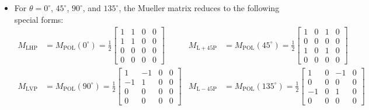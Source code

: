 \documentclass[10pt]{article}
\begin{document}
\begin{itemize}
		\item For $\theta = 0^\circ$, $45^\circ$, $90^\circ$, and $135^\circ$, the Mueller matrix reduces to the following special forms:
		\begin{align*}
			M_{\mathrm{LHP}} &= M_{\mathrm{POL}}(0^\circ) = \frac{1}{2} \begin{bmatrix}
				1 & 1 & 0 & 0 \\
				1 & 1 & 0 & 0 \\
				0 & 0 & 0 & 0 \\
				0 & 0 & 0 & 0
			\end{bmatrix} &
			M_{\mathrm{L+45P}} &= M_{\mathrm{POL}}(45^\circ) = \frac{1}{2} \begin{bmatrix}
				1 & 0 & 1 & 0 \\
				0 & 0 & 0 & 0 \\
				1 & 0 & 1 & 0 \\
				0 & 0 & 0 & 0
			\end{bmatrix} \\
			M_{\mathrm{LVP}} &= M_{\mathrm{POL}}(90^\circ) = \frac{1}{2} \begin{bmatrix}
				1 & -1 & 0 & 0 \\
				-1 & 1 & 0 & 0 \\
				0 & 0 & 0 & 0 \\
				0 & 0 & 0 & 0
			\end{bmatrix} &
			M_{\mathrm{L-45P}} &= M_{\mathrm{POL}}(135^\circ) = \frac{1}{2} \begin{bmatrix}
				1 & 0 & -1 & 0 \\
				0 & 0 & 0 & 0 \\
				-1 & 0 & 1 & 0 \\
				0 & 0 & 0 & 0
			\end{bmatrix}
		\end{align*}


\end{itemize}
\end{document}
